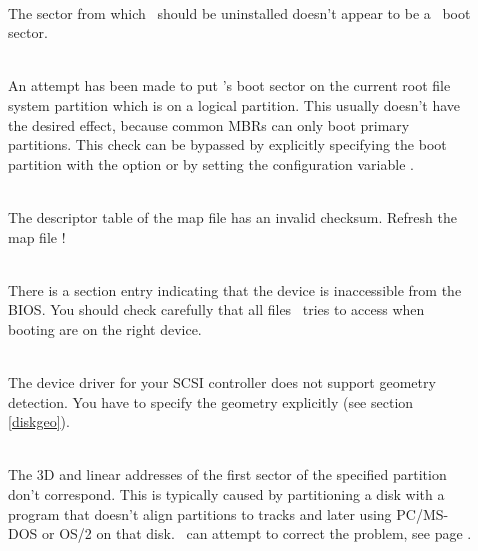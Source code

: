 \begin{description}
  \item[]
  \item[]~\\
    The sector from which \LILO\ should be uninstalled doesn't appear to be a
    \LILO\ boot sector.
  \item[]~\\
    An attempt has been made to put \LILO's boot sector on the current
    root file system partition which is on a logical partition. This usually
    doesn't have the desired effect, because common MBRs can only boot
    primary partitions. This check can be bypassed by explicitly
    specifying the boot partition with the  option or by setting
    the configuration variable .
  \item[]~\\
    The descriptor table of the map file has an invalid checksum. Refresh
    the map file  !
  \item[]~\\
     There is a  section entry indicating that the device is
     inaccessible
     from the BIOS. You should check carefully that all files \LILO\ tries to
     access when booting are on the right device.
  \item[]~\\
    The device driver for your SCSI controller does not support geometry
    detection. You have to specify the geometry explicitly (see section
    \ref{diskgeo}).
  \item[]~\\
    The 3D and linear addresses of the first sector of the specified partition
    don't correspond. This is typically caused by partitioning a disk with
    a program that doesn't align partitions to tracks and later using
    PC/MS-DOS or OS/2 on that disk. \LILO\ can attempt to correct the problem,
    see page \pageref{fix-table}.
  \item[]~\\

\end{description}
